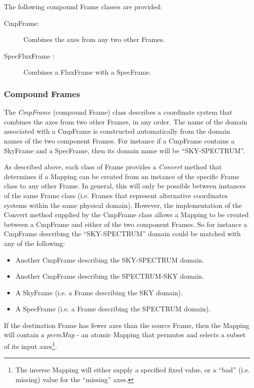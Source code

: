 \documentclass[final,authoryear,5p,times,twocolumn]{elsarticle}
\begin{document}
The following compound Frame classes are provided:

\begin{description}
\item[CmpFrame:] Combines the axes from any two other Frames.
\item[SpecFluxFrame :] Combines a FluxFrame with a SpecFrame.
\end{description}

\subsubsection{Compound Frames}
The \emph{CmpFrame} (compound Frame) class describes a coordinate system
that combines the axes from two other Frames, in any order. The name of
the domain associated with a CmpFrame is constructed automatically from
the domain names of the two component Frames. For instance if a CmpFrame
contains a SkyFrame and a SpecFrame, then its domain name will be
``SKY-SPECTRUM''.

As described above, each class of Frame provides a \emph{Convert} method
that determines if a Mapping can be created from an instance of the specific
Frame class to any other Frame. In general, this will only be possible
between instances of the same Frame class (i.e. Frames that represent
alternative coordinates systems within the same physical domain).
However, the implementation of the Convert method supplied by the
CmpFrame class allows a Mapping to be created between a CmpFrame and
either of the two component Frames. So for instance a CmpFrame describing
the ``SKY-SPECTRUM'' domain could be matched with any of the following:

\begin{itemize}
\item Another CmpFrame describing the SKY-SPECTRUM domain.
\item Another CmpFrame describing the SPECTRUM-SKY domain.
\item A SkyFrame (i.e. a Frame describing the SKY domain).
\item A SpecFrame (i.e. a Frame describing the SPECTRUM domain).
\end{itemize}

If the destination Frame has fewer axes than the source Frame, then the
Mapping will contain a \emph{permMap} - an atomic Mapping that permutes
and selects a subset of its input axes\footnote{The inverse Mapping will
either supply a specified fixed value, or a ``bad'' (i.e. missing) value
for the ``missing'' axes.}.
\end{document}
